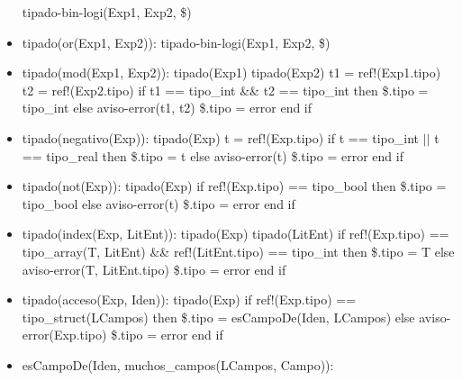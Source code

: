 \documentclass[11pt]{article}
\begin{document}
\begin{itemize}
                \subitem tipado-bin-logi(Exp1, Exp2, \$)
            \item tipado(or(Exp1, Exp2)): 
                \subitem tipado-bin-logi(Exp1, Exp2, \$)
            \item tipado(mod(Exp1, Exp2)): 
                \subitem tipado(Exp1) 
                \subitem tipado(Exp2) 
                \subitem t1 = ref!(Exp1.tipo) 
                \subitem t2 = ref!(Exp2.tipo) 
                \subitem if t1 == tipo\_int \&\&  t2 == tipo\_int then
                    \subsubitem \$.tipo = tipo\_int
                \subitem else 
                    \subsubitem aviso-error(t1, t2)
                    \subsubitem \$.tipo = error
                \subitem end if
            \item tipado(negativo(Exp)): 
                \subitem tipado(Exp) 
                \subitem t = ref!(Exp.tipo) 
                \subitem if t == tipo\_int $\vert \vert$ t == tipo\_real then
                    \subsubitem \$.tipo = t
                \subitem else 
                    \subsubitem aviso-error(t)
                    \subsubitem \$.tipo = error
                \subitem end if
            \item tipado(not(Exp)): 
                \subitem tipado(Exp) 
                \subitem if ref!(Exp.tipo) == tipo\_bool then
                    \subsubitem \$.tipo = tipo\_bool
                \subitem else 
                    \subsubitem aviso-error(t)
                    \subsubitem \$.tipo = error
                \subitem end if
            \item tipado(index(Exp, LitEnt)): 
                \subitem tipado(Exp) 
                \subitem tipado(LitEnt) 
                \subitem if ref!(Exp.tipo) == tipo\_array(T, LitEnt) \&\&  ref!(LitEnt.tipo) == tipo\_int then
                    \subsubitem \$.tipo = T
                \subitem else 
                    \subsubitem aviso-error(T, LitEnt.tipo)
                    \subsubitem \$.tipo = error
                \subitem end if
            \item tipado(acceso(Exp, Iden)): 
                \subitem tipado(Exp) 
                \subitem if ref!(Exp.tipo) == tipo\_struct(LCampos) then
                    \subsubitem \$.tipo = esCampoDe(Iden, LCampos)
                \subitem else 
                    \subsubitem aviso-error(Exp.tipo)
                    \subsubitem \$.tipo = error
                \subitem end if
            \item esCampoDe(Iden, muchos\_campos(LCampos, Campo)): 

\end{itemize}
\end{document}
